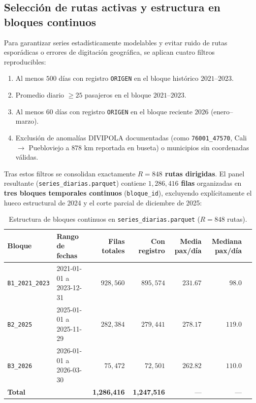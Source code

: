 \documentclass[11pt,a4paper]{article}
\begin{document}
\subsection{Selección de rutas activas y estructura en bloques continuos}

Para garantizar series estadísticamente modelables y evitar ruido de rutas esporádicas o errores de digitación geográfica, se aplican cuatro filtros reproducibles:
\begin{enumerate}[leftmargin=1.5em]
    \item Al menos $500$ días con registro \texttt{ORIGEN} en el bloque histórico $2021\text{--}2023$.
    \item Promedio diario $\ge 25$ pasajeros en el bloque $2021\text{--}2023$.
    \item Al menos $60$ días con registro \texttt{ORIGEN} en el bloque reciente $2026$ (enero--marzo).
    \item Exclusión de anomalías DIVIPOLA documentadas (como \texttt{76001\_47570}, Cali $\to$ Puebloviejo a $878\text{ km}$ reportada en buseta) o municipios sin coordenadas válidas.
\end{enumerate}

Tras estos filtros se consolidan exactamente \textbf{$R = 848$ rutas dirigidas}. El panel resultante (\texttt{series\_diarias.parquet}) contiene \textbf{$1{,}286{,}416$ filas} organizadas en \textbf{tres bloques temporales continuos} (\texttt{bloque\_id}), excluyendo explícitamente el hueco estructural de 2024 y el corte parcial de diciembre de 2025:

\begin{table}[H]
\centering
\caption{Estructura de bloques continuos en \texttt{series\_diarias.parquet} ($R=848$ rutas).}
\label{tab:bloques}
\begin{tabular}{llrrrrr}
\toprule
\textbf{Bloque} & \textbf{Rango de fechas} & \textbf{Filas totales} & \textbf{Con registro} & \textbf{Media pax/día} & \textbf{Mediana pax/día} \\
\midrule
\texttt{B1\_2021\_2023} & 2021-01-01 a 2023-12-31 & $928{,}560$ & $895{,}574$ & $231.67$ & $98.0$ \\
\texttt{B2\_2025}      & 2025-01-01 a 2025-11-29 & $282{,}384$ & $279{,}441$ & $278.17$ & $119.0$ \\
\texttt{B3\_2026}      & 2026-01-01 a 2026-03-30 & $75{,}472$  & $72{,}501$  & $262.82$ & $110.0$ \\
\midrule
\textbf{Total}         &                         & \textbf{1,286,416} & \textbf{1,247,516} & --- & --- \\
\bottomrule
\end{tabular}
\end{table}
\end{document}
